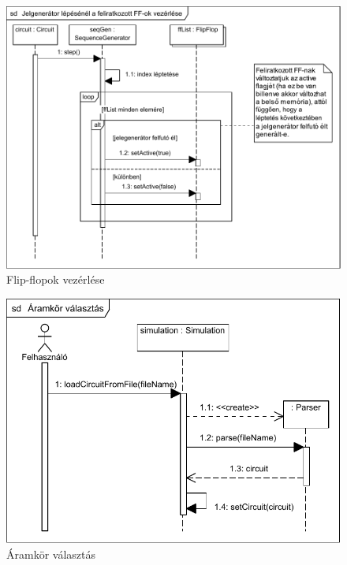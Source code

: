 \begin{figure}[H]
\begin{center}
\includegraphics{chapters/chapter04/seqdiagrams/ff_on_clk.pdf}
\caption{Flip-flopok vezérlése}
\label{fig:flipflopok_vezerlese}
\end{center}
\end{figure}

\begin{figure}[H]
\begin{center}
\includegraphics{chapters/chapter04/seqdiagrams/aramkor_valasztas.pdf}
\caption{Áramkör választás}
\label{fig:aramkor_valasztas}
\end{center}
\end{figure}

